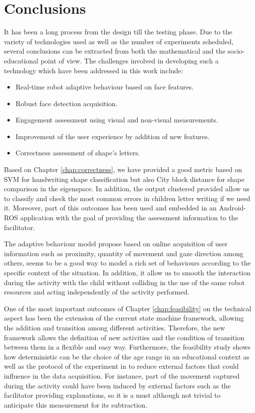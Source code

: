 \chapter{Conclusions} \label{chap:conclusions}

It has been a long process from the design till the testing phase. Due to the variety of technologies used as well as the number of experiments scheduled, several conclusions can be extracted from both the mathematical and the socio-educational point of view. The challenges involved in developing such a technology which have been addressed in this work include:

\begin{itemize}
\item Real-time robot adaptive behaviour based on face features.
\item Robust face detection acquisition.
\item Engagement assessment using visual and non-visual measurements.
\item Improvement of the user experience by addition of new features.
\item Correctness assessment of shape's letters. 
\end{itemize}

Based on Chapter \ref{chap:correctness}, we have provided a good metric based on SVM for handwriting shape classification but also City block distance for shape comparison in the eigenspace. In addition, the output clustered provided allow us to classify and check the most common errors in children letter writing if we need it. Moreover, part of this outcomes has been used  and embedded in an Android-ROS application with the goal of providing the assessment information to the facilitator. 

The adaptive behaviour model propose based on online acquisition of user information such as proximity, quantity of movement and gaze direction among others, seems to be a good way to model a rich set of behaviours according to the specific context of the situation. In addition, it allow us to smooth the interaction during the activity with the child without colliding in the use of the same robot resources and acting independently of the activity performed.  

One of the most important outcomes of Chapter \ref{chap:feasibility} on the technical aspect has been the extension of the current state machine framework, allowing the addition and transition among different activities. Therefore, the new framework allows the definition of new activities and the condition of transition between them in a flexible and easy way. Furthermore, the feasibility study shows how deterministic can be the choice of the age range in an educational context as well as the protocol of the experiment in to reduce external factors that could influence in the data acquisition. For instance, part of the movement captured during the activity could have been induced by external factors such as the facilitator providing explanations, so it is a must although not trivial to anticipate this measurement for its subtraction.

